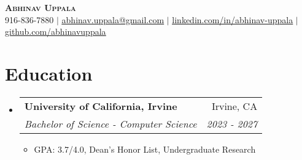 \documentclass[letterpaper,11pt]{article}
\makeatletter
\newcommand{\resumeItem}[1]{
  \item\small{
    {#1 \vspace{-2pt}}
  }
}
\newcommand{\resumeSubheading}[4]{
  \vspace{-2pt}\item
    \begin{tabular*}{0.97\textwidth}[t]{l@{\extracolsep{\fill}}r}
      \textbf{#1} & #2 \\
      \textit{\small#3} & \textit{\small #4} \\
    \end{tabular*}\vspace{-7pt}
}
\newcommand{\resumeSubHeadingListStart}{\begin{itemize}[leftmargin=0.15in, label={}]}
\newcommand{\resumeSubHeadingListEnd}{\end{itemize}}
\newcommand{\resumeItemListStart}{\begin{itemize}}
\newcommand{\resumeItemListEnd}{\end{itemize}\vspace{-5pt}}
\makeatother
\begin{document}



\begin{center}
    \textbf{\Huge \scshape Abhinav Uppala} \\ \vspace{4pt}
    \small 916-836-7880 $|$ \href{mailto:abhinav.uppala@gmail.com}     
        {\underline{abhinav.uppala@gmail.com}} $|$ \href{https://www.linkedin.com/in/abhinav-uppala/}
        {\underline{linkedin.com/in/abhinav-uppala}} $|$
    \href{https://github.com/abhinavuppala}{\underline{github.com/abhinavuppala}}
\end{center}




\section{Education}
  \resumeSubHeadingListStart
    \resumeSubheading
      {University of California, Irvine}{Irvine, CA}
      {Bachelor of Science - Computer Science}{2023 - 2027}
      \resumeItemListStart
        \resumeItem{GPA: 3.7/4.0, Dean's Honor List, Undergraduate Research}
      \resumeItemListEnd
  \resumeSubHeadingListEnd
\end{document}
